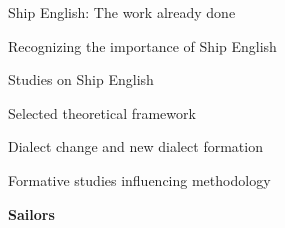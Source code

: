 \begin{listWWNumivleveli}
\item 
\setcounter{listWWNumivlevelii}{0}
\begin{listWWNumivlevelii}
\item 
\begin{styleNormali}
Ship English: The work already done
\end{styleNormali}


\setcounter{listWWNumivleveliii}{0}
\begin{listWWNumivleveliii}
\item 
\begin{styleNormali}
Recognizing the importance of Ship English 
\end{styleNormali}

\item 
\begin{styleNormali}
Studies on Ship English
\end{styleNormali}

\end{listWWNumivleveliii}
\item 
\begin{styleNormali}
Selected theoretical framework 
\end{styleNormali}


\setcounter{listWWNumivleveliii}{0}
\begin{listWWNumivleveliii}
\item 
\begin{styleNormali}
Dialect change and new dialect formation 
\end{styleNormali}

\item 
\begin{styleNormali}
Formative studies influencing methodology
\end{styleNormali}

\end{listWWNumivleveliii}
\end{listWWNumivlevelii}
\end{listWWNumivleveli}
\setcounter{listWWNumiileveli}{0}
\begin{listWWNumiileveli}
\item 
\begin{styleNormali}
\textbf{Sailors }
\end{styleNormali}

\end{listWWNumiileveli}
\setcounter{listWWNumvleveli}{2}
